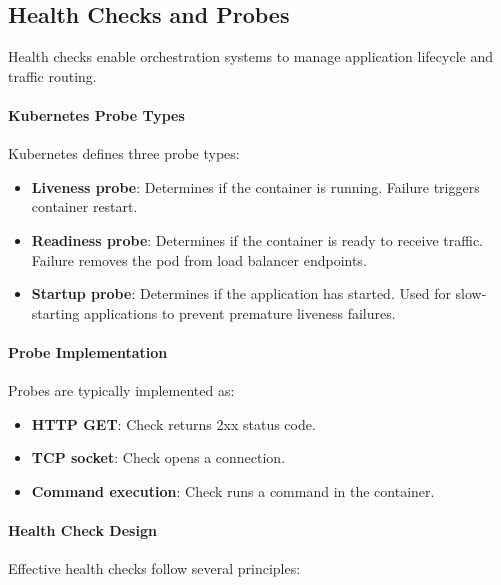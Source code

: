 \subsection{Health Checks and Probes}

Health checks enable orchestration systems to manage application lifecycle and traffic routing.

\paragraph{Kubernetes Probe Types}

Kubernetes defines three probe types:

\begin{itemize}
    \item \textbf{Liveness probe}: Determines if the container is running. Failure triggers container restart.
    
    \item \textbf{Readiness probe}: Determines if the container is ready to receive traffic. Failure removes the pod from load balancer endpoints.
    
    \item \textbf{Startup probe}: Determines if the application has started. Used for slow-starting applications to prevent premature liveness failures.
\end{itemize}

\paragraph{Probe Implementation}

Probes are typically implemented as:
\begin{itemize}
    \item \textbf{HTTP GET}: Check returns 2xx status code.
    \item \textbf{TCP socket}: Check opens a connection.
    \item \textbf{Command execution}: Check runs a command in the container.
\end{itemize}

\paragraph{Health Check Design}

Effective health checks follow several principles:

